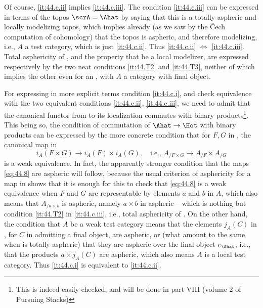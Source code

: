 Of course, \ref{it:44.c.ii} implies \ref{it:44.c.iii}. The condition
\ref{it:44.c.iii} can be expressed in terms of the topos $\scrA=\Ahat$
by saying that this is a totally aspheric and locally modelizing
topos, which implies already (as we saw by the \v Cech computation of
cohomology) that the topos is aspheric, and therefore modelizing,
i.e., $A$ a test category, which is just \ref{it:44.c.ii}. Thus
\ref{it:44.c.ii} $\Leftrightarrow$ \ref{it:44.c.iii}. Total
asphericity of \scrA, and the property that \scrA{} be a local
modelizer, are expressed respectively by the two neat conditions
\ref{it:44.T2} and \ref{it:44.T3}, neither of which implies the other
even for an \Ahat, with $A$ a category with final object.

For expressing in more explicit terms condition \ref{it:44.c.i}, and
check equivalence with the two equivalent conditions \ref{it:44.c.ii},
\ref{it:44.c.iii}, we need to admit that the canonical functor from
\Cat{} to its localization \Hot{} commutes with binary products\footnote{This is indeed easily checked, and will be done in part VIII (volume 2 of Pursuing Stacks)}. This
being so, the condition of commutation of $\Ahat\to\Hot$ with binary
products can be expressed by the more concrete condition that for
$F,G$ in \Ahat{}, the canonical map in \Cat
\begin{equation}
  \label{eq:44.8}
  i_A(F\times G) \to i_A(F) \times i_A(G), \quad\text{i.e.,
    $A_{/F\times G}\to A_{/F}\times A_{/G}$}\tag{8}
\end{equation}
is a weak equivalence. In fact, the apparently stronger condition that
the maps \eqref{eq:44.8} are aspheric will follow, because the usual
criterion of asphericity for a map in \Cat{} shows that it is enough
for this to check that \eqref{eq:44.8} is a weak equivalence when $F$
and $G$ are representable by elements $a$ and $b$ in $A$, which also
means that $A_{/a\times b}$ is aspheric, namely $a\times b$ in \Ahat{}
aspheric -- which is nothing but condition \ref{it:44.T2} in
\ref{it:44.c.iii}, i.e., total asphericity of \Ahat. On the other
hand, the condition that $A$ be a weak test category means that the
elements $j_A(C)$ in \Ahat, for $C$ in \Cat{} admitting a final
object, are aspheric, or (what amount to the same when \Ahat{} is
totally aspheric) that they are aspheric over the final object
$e_\Ahat$, i.e., that the products $a\times j_A(C)$ are aspheric,
which also means $A$ is a local test category. Thus \ref{it:44.c.i} is
equivalent to \ref{it:44.c.ii}.

